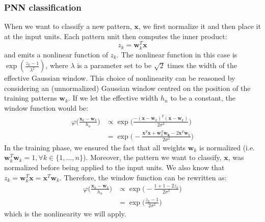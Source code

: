 	\subsubsection*{PNN classification}
	When we want to classify a new pattern, $\mathbf{x}$, we first normalize it and then place it at the input units. Each pattern unit then computes the inner product:
	\begin{equation}
		z_k = \mathbf{w}_k^T \mathbf{x}
		\label{Eq: impl/ml/pnn/innerprod}
	\end{equation}   
	and emits a nonlinear function of $z_k$. The nonlinear function in this case is $\exp(\frac{z_k-1}{\lambda^2})$, where $\lambda$ is a parameter set to be $\sqrt{2}$ times the width of the effective Gaussian window. This choice of nonlinearity can be reasoned by considering an (unnormalized) Gaussian window centred on the position of the training patterns $\mathbf{w}_k$. If we let the effective width $h_n$ to be a constant, the window function would be:
	\begin{equation}
		\begin{split}
			\varphi\bigg(\frac{\mathbf{x}_k - \mathbf{w}_k}{h_n}\bigg) & \propto \exp\bigg(\frac{
				-(\mathbf{x}-\mathbf{w}_k)^T(\mathbf{x}-\mathbf{w}_k)
			}{
				2\sigma^2
			}\bigg) \\
		 & = \exp\bigg(
			 -
			 \frac{
				 \mathbf{x}^T\mathbf{x} + \mathbf{w}_k^T\mathbf{w_k} - 2\mathbf{x}^T\mathbf{w}_k 	
			 }{
				 2\sigma^2
			 }
		 \bigg)
		\end{split}
	\end{equation}
	In the training phase, we ensured the fact that all weights $\mathbf{w}_k$ is normalized (i.e. $\mathbf{w}_k^T\mathbf{w}_k = 1, \forall k \in \{1,\dots,n\}$). Moreover, the pattern we want to classify, $\mathbf{x}$, was normalized before being applied to the input units. We also know that $z_k = \mathbf{w}_k^T\mathbf{x} = \mathbf{x}^T\mathbf{w}_k$. Therefore, the window function can be rewritten as: 
	\begin{equation}
		\begin{split}
			\varphi\bigg(\frac{\mathbf{x}_k - \mathbf{w}_k}{h_n}\bigg) & \propto
				\exp\bigg(
					-
					\frac{
						1 + 1 - 2z_k
					}{
						2\sigma^2
					}
				\bigg) \\
				& = \exp \bigg(
					\frac{
						z_k - 1
					}{
						2\sigma^2
					}
				\bigg)
		\end{split}
	\end{equation}
	which is the nonlinearity we will apply. 
	\\ \\
